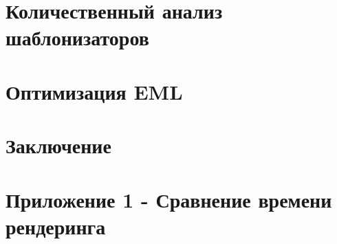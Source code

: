 \newpage
\section{Количественный анализ шаблонизаторов}


\newpage
\section{Оптимизация EML}


\newpage
\section*{Заключение}





\appendix
\section{Приложение 1 - Сравнение времени рендеринга}




